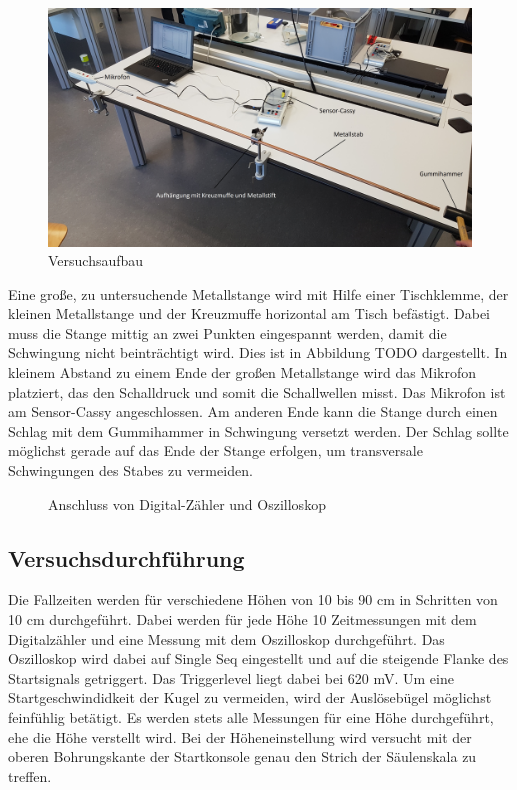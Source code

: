 \documentclass[a4paper, 12pt]{scrartcl}
\begin{document}
\begin{figure}[h]
	\centering
	\includegraphics[width=\linewidth]{bilder/aufbau_festkoerper.jpg}
	\caption{Versuchsaufbau}
\end{figure}

Eine große, zu untersuchende Metallstange wird mit Hilfe einer Tischklemme, der kleinen Metallstange und der Kreuzmuffe horizontal am Tisch befästigt. Dabei muss die Stange mittig an zwei Punkten eingespannt werden, damit die Schwingung nicht beinträchtigt wird. Dies ist in Abbildung TODO dargestellt. In kleinem Abstand zu einem Ende der großen Metallstange wird das Mikrofon platziert, das den Schalldruck und somit die Schallwellen misst. Das Mikrofon ist am Sensor-Cassy angeschlossen. Am anderen Ende kann die Stange durch einen Schlag mit dem Gummihammer in Schwingung versetzt werden. Der Schlag sollte möglichst gerade auf das Ende der Stange erfolgen, um transversale Schwingungen des Stabes zu vermeiden.

\begin{figure}[h]
	\centering
	\caption{Anschluss von Digital-Zähler und Oszilloskop}
	\label{AnschlussOsDz}
\end{figure}



\subsection{Versuchsdurchführung}

Die Fallzeiten werden für verschiedene Höhen von 10 bis 90 cm in Schritten von 10 cm durchgeführt. Dabei werden für jede Höhe 10 Zeitmessungen mit dem Digitalzähler und eine Messung mit dem Oszilloskop durchgeführt. Das Oszilloskop wird dabei auf Single Seq eingestellt und auf die steigende Flanke des Startsignals getriggert. Das Triggerlevel liegt dabei bei 620 mV. Um eine Startgeschwindidkeit der Kugel zu vermeiden, wird der Auslösebügel möglichst feinfühlig betätigt. Es werden stets alle Messungen für eine Höhe durchgeführt, ehe die Höhe verstellt wird. Bei der Höheneinstellung wird versucht mit der oberen Bohrungskante der Startkonsole genau den Strich der Säulenskala zu treffen.
\end{document}
